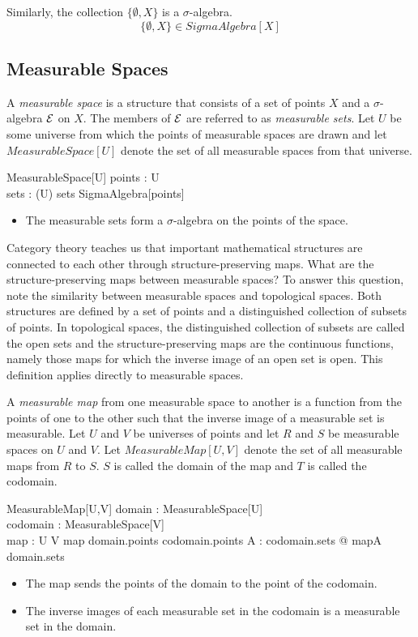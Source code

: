 \documentclass{article}
\begin{document}
Similarly, the collection $\{ \emptyset, X \}$ is a $\sigma$-algebra.
\begin{equation}
	\{ \emptyset, X \} \in SigmaAlgebra[X]
\end{equation}

\subsection{Measurable Spaces}

A {\it measurable space} is a structure that consists of a set of points $X$ and a $\sigma$-algebra ${\cal E}$ on $X$.
The members of ${\cal E}$ are referred to as {\it measurable sets}.
Let $U$ be some universe from which the points of measurable spaces are drawn and let $MeasurableSpace[U]$ denote the set of all measurable spaces from that universe.
\begin{schema}{MeasurableSpace}[U]
	points : \power U \\
	sets : \power (\power U)
\where
	sets \in SigmaAlgebra[points]
\end{schema}
\begin{itemize}
\item The measurable sets form a $\sigma$-algebra on the points of the space.
\end{itemize}


Category theory teaches us that important mathematical structures are connected to each other through structure-preserving maps.
What are the structure-preserving maps between measurable spaces?
To answer this question, note the similarity between measurable spaces and topological spaces.
Both structures are defined by a set of points and a distinguished collection of subsets of points.
In topological spaces, the distinguished collection of subsets are called the open sets and the structure-preserving maps are the continuous
functions, namely those maps for which the inverse image of an open set is open.
This definition applies directly to measurable spaces.

A {\it measurable map} from one measurable space to another is a function from the points of one to the other such that the inverse image
of a measurable set is measurable.
Let $U$ and $V$ be universes of points and let $R$ and $S$ be measurable spaces on $U$ and $V$. 
Let $MeasurableMap[U,V]$ denote the set of all measurable maps from $R$ to $S$.
$S$ is called the domain of the map and $T$ is called the codomain.
\begin{schema}{MeasurableMap}[U,V]
	domain : MeasurableSpace[U] \\
	codomain : MeasurableSpace[V] \\
	map : U \pfun V
\where
	map \in domain.points \fun codomain.points
\also
	\forall A : codomain.sets @ map\inv\limg A \rimg \in domain.sets
\end{schema}
\begin{itemize}
\item The map sends the points of the domain to the point of the codomain.
\item The inverse images of each measurable set in the codomain is a measurable set in the domain.
\end{itemize}
\end{document}
